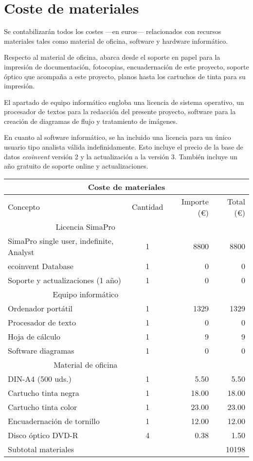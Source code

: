 \chapter*{Coste de materiales}
Se contabilizarán todos los costes —en euros— relacionados con recursos materiales tales como material de oficina, software y hardware informático.

Respecto al material de oficina, abarca desde el soporte en papel para la impresión de documentación, fotocopias, encuadernación de este proyecto, soporte óptico que acompaña a este proyecto, planos hasta los cartuchos de tinta para su impresión.

El apartado de equipo informático engloba una licencia de sistema operativo, un procesador de textos para la redacción del presente proyecto, software para la creación de diagramas de flujo y tratamiento de imágenes.

En cuanto al software informático, se ha incluido una licencia para un único usuario tipo analista válida indefinidamente. Esto incluye el precio de la base de datos \textit{ecoinvent} versión 2 y la actualización a la versión 3. También incluye un año gratuito de soporte online y actualizaciones.

\begin{table}[!htb]
\centering
\begin{tabular}{lcrr}
\toprule
\multicolumn{4}{c}{Coste de materiales}\\
\midrule
Concepto & Cantidad & Importe (\euro) & Total (\euro)\\
\midrule
\multicolumn{2}{c}{Licencia SimaPro}\\
\cmidrule(r){1-2}
SimaPro single user, indefinite, Analyst & 1 & 8800 & 8800\\
ecoinvent Database & 1 & 0 & 0\\
Soporte y actualizaciones (1 año) & 1 & 0 & 0\\
\multicolumn{2}{c}{Equipo informático}\\
\cmidrule(r){1-2}
Ordenador portátil & 1 & 1329 & 1329\\
Procesador de texto & 1 & 0 & 0\\
Hoja de cálculo & 1 & 9 & 9\\
Software diagramas & 1 & 0 & 0\\
\multicolumn{2}{c}{Material de oficina}\\
\cmidrule(r){1-2}
DIN-A4 (500 uds.) & 1 & 5.50 & 5.50\\
Cartucho tinta negra & 1 & 18.00 & 18.00\\
Cartucho tinta color & 1 & 23.00 & 23.00\\
Encuadernación de tornillo & 1 & 12.00 & 12.00\\
Disco óptico DVD-R & 4 & 0.38 & 1.50\\
\bottomrule
Subtotal materiales & & & 10198\\
\bottomrule
\end{tabular}
\label{presupuestomateriales}
\end{table}

